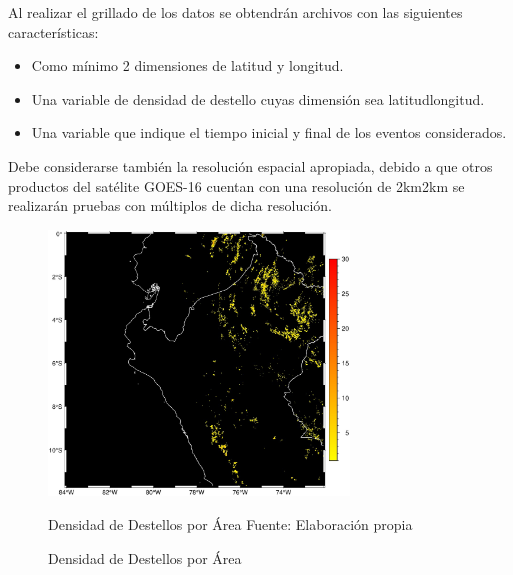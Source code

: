 Al realizar el grillado de los datos se obtendrán archivos con las siguientes 
características:

\begin{itemize}
  \item Como mínimo 2 dimensiones de latitud y longitud.
  \item Una variable de densidad de destello cuyas dimensión sea 
  latitud\times longitud.
  \item Una variable que indique el tiempo inicial y final de los eventos 
  considerados.
\end{itemize}

Debe considerarse también la resolución espacial apropiada, debido a que otros 
productos del satélite GOES-16 cuentan con una resolución de 2km\times 2km 
se realizarán pruebas con múltiplos de dicha resolución.

\begin{figure}[H]
  \centering
  \includegraphics[width=8cm]{E_IMAGENES/5_Metodologia/fed_puntual}
  \caption{Densidad de Destellos por Área}{\begin{center}
    Densidad de Destellos por Área\newline
    Fuente: Elaboración propia
    \end{center}
  }
  \label{fig:fed_1km}
\end{figure}